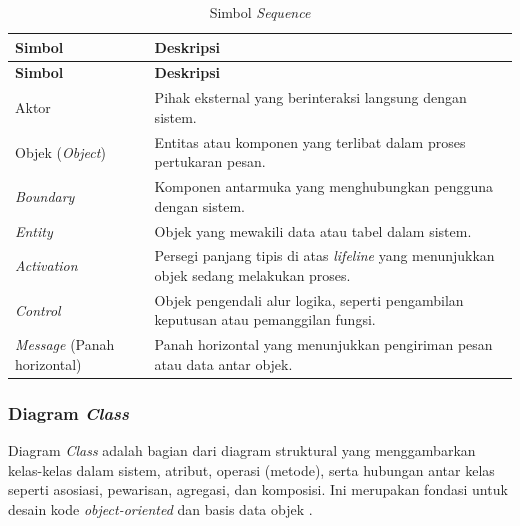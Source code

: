 \begin{longtable}{|p{}|p{}|}
	\caption{Simbol \textit{Sequence}}
	\label{table:2.simbolSequence}\\
	\hline
	\textbf{Simbol} & \textbf{Deskripsi} \\
	\hline
	\endfirsthead
	\hline
	\textbf{Simbol} & \textbf{Deskripsi} \\
	\hline
	\endhead
	Aktor & Pihak eksternal yang berinteraksi langsung dengan sistem. \\
	\hline
	Objek (\textit{Object}) & Entitas atau komponen yang terlibat dalam proses pertukaran pesan. \\
	\hline
	\textit{Boundary} & Komponen antarmuka yang menghubungkan pengguna dengan sistem. \\
	\hline
	\textit{Entity} & Objek yang mewakili data atau tabel dalam sistem. \\
	\hline
	\textit{Activation} & Persegi panjang tipis di atas \textit{lifeline} yang menunjukkan objek sedang melakukan proses. \\
	\hline
	\textit{Control} & Objek pengendali alur logika, seperti pengambilan keputusan atau pemanggilan fungsi. \\
	\hline
	\textit{Message} (Panah horizontal) & Panah horizontal yang menunjukkan pengiriman pesan atau data antar objek. \\
	\hline
\end{longtable}

\subsubsection{Diagram \textit{Class}} \label{II.DiagramClass}
Diagram \textit{Class} adalah bagian dari diagram struktural yang menggambarkan kelas-kelas dalam sistem, atribut, operasi (metode), serta hubungan antar kelas seperti asosiasi, pewarisan, agregasi, dan komposisi. Ini merupakan fondasi untuk desain kode \textit{object-oriented} dan basis data objek \cite{bergstrom2022evaluating}.\par

